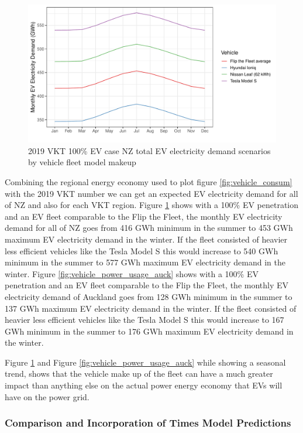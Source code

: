 \documentclass[
]{article}
\begin{document}
\begin{figure}
\centering
\includegraphics{final_report_files/figure-latex/vehicle_power_usage-1.pdf}
\caption{2019 VKT 100\% EV case NZ total EV electricity demand scenarios
by vehicle fleet model makeup\label{fig:vehicle_power_usage}}
\end{figure}

Combining the regional energy economy used to plot figure
\ref{fig:vehicle_consum} with the 2019 VKT number we can get an expected
EV electricity demand for all of NZ and also for each VKT region. Figure
\ref{fig:vehicle_power_usage} shows with a 100\% EV penetration and an
EV fleet comparable to the Flip the Fleet, the monthly EV electricity
demand for all of NZ goes from 416 GWh minimum in the summer to 453 GWh
maximum EV electricity demand in the winter. If the fleet consisted of
heavier less efficient vehicles like the Tesla Model S this would
increase to 540 GWh minimum in the summer to 577 GWh maximum EV
electricity demand in the winter. Figure
\ref{fig:vehicle_power_usage_auck} shows with a 100\% EV penetration and
an EV fleet comparable to the Flip the Fleet, the monthly EV electricity
demand of Auckland goes from 128 GWh minimum in the summer to 137 GWh
maximum EV electricity demand in the winter. If the fleet consisted of
heavier less efficient vehicles like the Tesla Model S this would
increase to 167 GWh minimum in the summer to 176 GWh maximum EV
electricity demand in the winter.

Figure \ref{fig:vehicle_power_usage} and Figure
\ref{fig:vehicle_power_usage_auck} while showing a seasonal trend, shows
that the vehicle make up of the fleet can have a much greater impact
than anything else on the actual power energy economy that EVs will have
on the power grid.

\hypertarget{comparison-and-incorporation-of-times-model-predictions}{%
\subsubsection{Comparison and Incorporation of Times Model
Predictions}\label{comparison-and-incorporation-of-times-model-predictions}}
\end{document}
